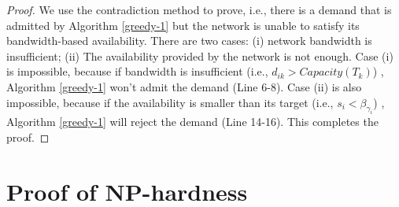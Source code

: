 \documentclass[sigconf]{acmart}
\begin{document}
\begin{appendices}
\begin{proof}
We use the contradiction method to prove, i.e., there is a demand that is admitted by Algorithm \ref{greedy-1} but the network is unable to satisfy its bandwidth-based availability.
There are two cases: (i) network bandwidth is insufficient; (ii) The availability provided by the network is not enough. 
Case (i) is impossible, because if bandwidth is insufficient (i.e., $d_{ik}> Capacity (T_k)$) , Algorithm \ref{greedy-1} won't admit the demand (Line 6-8).
Case (ii) is also impossible, because if the availability is smaller than its target (i.e., $s_i <   \beta_{\gamma_{i}}$) , Algorithm \ref{greedy-1} will reject the demand (Line 14-16).
This completes the proof. 
\end{proof}


\section{Proof of NP-hardness} \label{appendix1}


\end{appendices}
\end{document}
